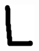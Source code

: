 \documentclass[russian,utf8,emptystyle]{eskdtext}
\begin{document}
\begin{figure}[!htb]
\includegraphics[width=\linewidth]{../data/learn/l/001}
\endminipage\hfill
{}

\end{figure}
\end{document}
